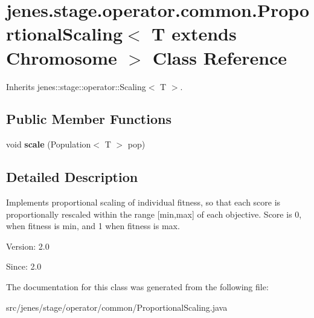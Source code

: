 \hypertarget{classjenes_1_1stage_1_1operator_1_1common_1_1_proportional_scaling_3_01_t_01extends_01_chromosome_01_4}{
\section{jenes.stage.operator.common.ProportionalScaling$<$ T extends Chromosome $>$ Class Reference}
\label{classjenes_1_1stage_1_1operator_1_1common_1_1_proportional_scaling_3_01_t_01extends_01_chromosome_01_4}
}
Inherits jenes::stage::operator::Scaling$<$ T $>$.

\subsection*{Public Member Functions}
\begin{CompactItemize}
\item 
\hypertarget{classjenes_1_1stage_1_1operator_1_1common_1_1_proportional_scaling_3_01_t_01extends_01_chromosome_01_4_5b8ae9f116348cebc390e0a58602a704}{
void \textbf{scale} (Population$<$ T $>$ pop)}
\label{classjenes_1_1stage_1_1operator_1_1common_1_1_proportional_scaling_3_01_t_01extends_01_chromosome_01_4_5b8ae9f116348cebc390e0a58602a704}

\end{CompactItemize}


\subsection{Detailed Description}
Implements proportional scaling of individual fitness, so that each score is proportionally rescaled within the range \mbox{[}min,max\mbox{]} of each objective. Score is 0, when fitness is min, and 1 when fitness is max.

\begin{Desc}
\item[Version:]2.0 \end{Desc}
\begin{Desc}
\item[Since:]2.0 \end{Desc}


The documentation for this class was generated from the following file:\begin{CompactItemize}
\item 
src/jenes/stage/operator/common/ProportionalScaling.java\end{CompactItemize}
